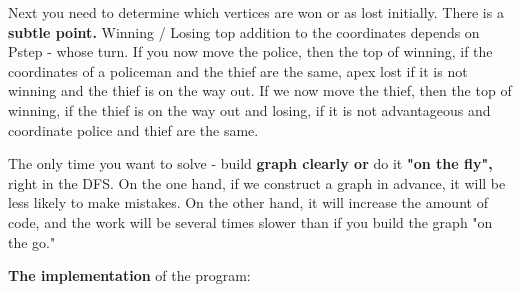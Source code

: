 Next you need to determine which vertices are won or as lost initially. There is a \textbf{subtle point.} Winning / Losing top addition to the coordinates depends on Pstep - whose turn. If you now move the police, then the top of winning, if the coordinates of a policeman and the thief are the same, apex lost if it is not winning and the thief is on the way out. If we now move the thief, then the top of winning, if the thief is on the way out and losing, if it is not advantageous and coordinate police and thief are the same.

The only time you want to solve - build \textbf{graph clearly or} do it \textbf{"on the fly",} right in the DFS. On the one hand, if we construct a graph in advance, it will be less likely to make mistakes. On the other hand, it will increase the amount of code, and the work will be several times slower than if you build the graph "on the go."

\textbf{The implementation} of the program:

